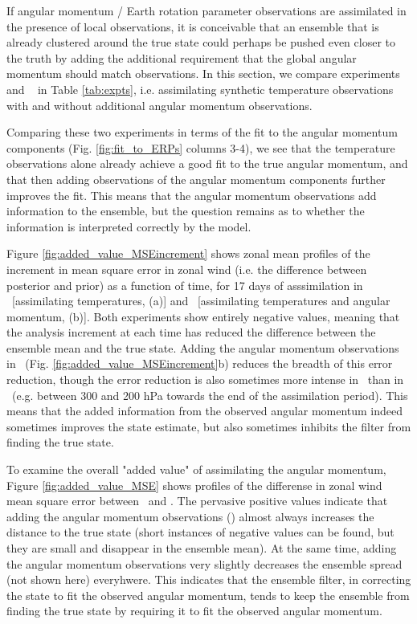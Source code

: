 If angular momentum / Earth rotation parameter observations are assimilated in the presence of local observations, it is conceivable that an ensemble that is already clustered around the true state could perhaps be pushed even closer to the truth by adding the additional requirement that the global angular momentum should match observations. 
In this section, we compare experiments \RST~ and \ERPRST~ in Table \ref{tab:expts}, i.e. assimilating synthetic temperature observations with and without additional angular momentum observations.

Comparing these two experiments in terms of the fit to the angular momentum components (Fig. \ref{fig:fit_to_ERPs} columns 3-4), we see that the temperature observations alone already achieve a good fit to the true angular momentum, and that 
then adding observations of the angular momentum components further improves the fit.  
This means that the angular momentum observations add information to the ensemble, but the question remains as to whether the information is interpreted correctly by the model.

Figure \ref{fig:added_value_MSEincrement} shows zonal mean profiles of the increment in mean square error in zonal wind (i.e. the difference between posterior and prior) as a function of time, for 17 days of asssimilation in \RST~[assimilating temperatures, (a)] and \ERPRST~[assimilating temperatures and angular momentum, (b)].  
Both experiments show entirely negative values, meaning that the analysis increment at each time has reduced the difference between the ensemble mean and the true state.  
Adding the angular momentum observations in \ERPRST~(Fig. \ref{fig:added_value_MSEincrement}b) reduces the breadth of this error reduction, though the error reduction is also sometimes more intense in \ERPRST~than in \RST~(e.g. between 300 and 200 hPa towards the end of the assimilation period). 
This means that the added information from the observed angular momentum indeed sometimes improves the state estimate, but also sometimes inhibits the filter from finding the true state. 

To examine the overall "added value" of assimilating the angular momentum, Figure \ref{fig:added_value_MSE} shows profiles of the differense in zonal wind mean square error between \ERPRST~and \RST. 
The pervasive positive values indicate that adding the angular momentum observations (\ERPRST) almost always increases the distance to the true state (short instances of negative values can be found, but they are small and disappear in the ensemble mean). 
At the same time, adding the angular momentum observations very slightly decreases the ensemble spread (not shown here) everyhwere.  
This indicates that the ensemble filter, in correcting the state to fit the observed angular momentum, tends to keep the ensemble from finding the true state by requiring it to fit the observed angular momentum.  

